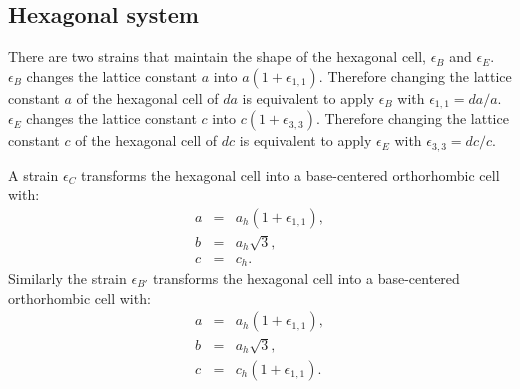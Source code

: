 \documentclass[12pt,a4paper]{article}
\begin{document}
%



\subsection{\color{web-blue}Hexagonal system}
There are two strains that maintain the shape of the hexagonal cell,
$\epsilon_B$ and $\epsilon_E$.
$\epsilon_B$ changes the lattice constant $a$ into $a(1+\epsilon_{1,1})$. 
Therefore changing the lattice constant $a$ of the hexagonal cell of $da$
is equivalent to apply $\epsilon_B$ with $\epsilon_{1,1}=da/a$.
$\epsilon_E$ changes the lattice constant $c$ into $c(1+\epsilon_{3,3})$. 
Therefore changing the lattice constant $c$ of the hexagonal cell of $dc$
is equivalent to apply $\epsilon_E$ with $\epsilon_{3,3}=dc/c$.

A strain $\epsilon_C$ transforms the hexagonal cell into a base-centered 
orthorhombic cell with:
\begin{eqnarray}
a&=&a_h (1+\epsilon_{1,1}), \\
b&=&a_h \sqrt{3}, \\
c&=&c_h.
\end{eqnarray}
Similarly the strain $\epsilon_{B'}$ transforms the hexagonal cell into
a base-centered orthorhombic cell with:
\begin{eqnarray}
a&=&a_h (1+\epsilon_{1,1}), \\
b&=&a_h \sqrt{3}, \\
c&=&c_h (1+\epsilon_{1,1}).
\end{eqnarray}
\end{document}
